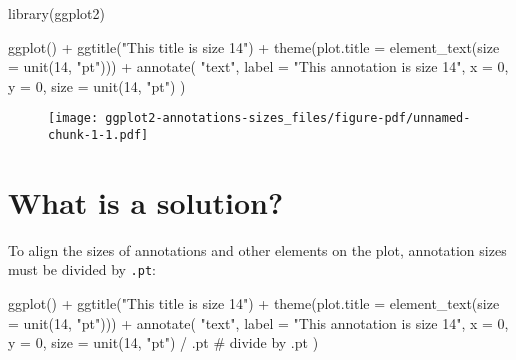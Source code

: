 \documentclass[
  letterpaper,
  DIV=11,
  numbers=noendperiod]{scrreprt}
\newenvironment{Shaded}{\begin{snugshade}}{\end{snugshade}}
\newcommand{\AttributeTok}[1]{\textcolor[rgb]{0.40,0.45,0.13}{#1}}
\newcommand{\CommentTok}[1]{\textcolor[rgb]{0.37,0.37,0.37}{#1}}
\newcommand{\DecValTok}[1]{\textcolor[rgb]{0.68,0.00,0.00}{#1}}
\newcommand{\FunctionTok}[1]{\textcolor[rgb]{0.28,0.35,0.67}{#1}}
\newcommand{\NormalTok}[1]{\textcolor[rgb]{0.00,0.23,0.31}{#1}}
\newcommand{\SpecialCharTok}[1]{\textcolor[rgb]{0.37,0.37,0.37}{#1}}
\newcommand{\StringTok}[1]{\textcolor[rgb]{0.13,0.47,0.30}{#1}}
\begin{document}
\begin{Shaded}
\begin{Highlighting}[]
\FunctionTok{library}\NormalTok{(ggplot2)}

\FunctionTok{ggplot}\NormalTok{() }\SpecialCharTok{+}
  \FunctionTok{ggtitle}\NormalTok{(}\StringTok{"This title is size 14"}\NormalTok{) }\SpecialCharTok{+}
  \FunctionTok{theme}\NormalTok{(}\AttributeTok{plot.title =} \FunctionTok{element\_text}\NormalTok{(}\AttributeTok{size =} \FunctionTok{unit}\NormalTok{(}\DecValTok{14}\NormalTok{, }\StringTok{"pt"}\NormalTok{))) }\SpecialCharTok{+}
  \FunctionTok{annotate}\NormalTok{(}
    \StringTok{"text"}\NormalTok{,}
    \AttributeTok{label =} \StringTok{"This annotation is size 14"}\NormalTok{,}
    \AttributeTok{x =} \DecValTok{0}\NormalTok{, }\AttributeTok{y =} \DecValTok{0}\NormalTok{,}
    \AttributeTok{size =} \FunctionTok{unit}\NormalTok{(}\DecValTok{14}\NormalTok{, }\StringTok{"pt"}\NormalTok{)}
\NormalTok{  )}
\end{Highlighting}
\end{Shaded}

\begin{figure}[H]

{\centering \texttt{[image: ggplot2-annotations-sizes\_files/figure-pdf/unnamed-chunk-1-1.pdf]}

}

\end{figure}

\hypertarget{what-is-a-solution}{%
\section{What is a solution?}\label{what-is-a-solution}}

To align the sizes of annotations and other elements on the plot,
annotation sizes must be divided by \texttt{.pt}:

\begin{Shaded}
\begin{Highlighting}[]
\FunctionTok{ggplot}\NormalTok{() }\SpecialCharTok{+}
  \FunctionTok{ggtitle}\NormalTok{(}\StringTok{"This title is size 14"}\NormalTok{) }\SpecialCharTok{+}
  \FunctionTok{theme}\NormalTok{(}\AttributeTok{plot.title =} \FunctionTok{element\_text}\NormalTok{(}\AttributeTok{size =} \FunctionTok{unit}\NormalTok{(}\DecValTok{14}\NormalTok{, }\StringTok{"pt"}\NormalTok{))) }\SpecialCharTok{+}
  \FunctionTok{annotate}\NormalTok{(}
    \StringTok{"text"}\NormalTok{,}
    \AttributeTok{label =} \StringTok{"This annotation is size 14"}\NormalTok{,}
    \AttributeTok{x =} \DecValTok{0}\NormalTok{, }\AttributeTok{y =} \DecValTok{0}\NormalTok{,}
    \AttributeTok{size =} \FunctionTok{unit}\NormalTok{(}\DecValTok{14}\NormalTok{, }\StringTok{"pt"}\NormalTok{) }\SpecialCharTok{/}\NormalTok{ .pt }\CommentTok{\# divide by .pt}
\NormalTok{  )}
\end{Highlighting}
\end{Shaded}
\end{document}
